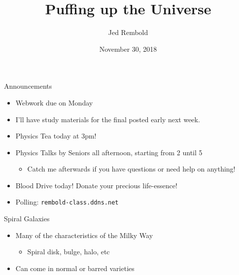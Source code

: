 \documentclass[pdf, aspectratio=169]{beamer}
\title{Puffing up the Universe}
\author{Jed Rembold}
\date{November 30, 2018}
\begin{document}
\renewcommand{\theenumi}{\Alph{enumi}}

\begin{frame}{Announcements}
	\begin{itemize}
		\item Webwork due on Monday
		\item I'll have study materials for the final posted early next week.
		\item Physics Tea today at 3pm!
		\item Physics Talks by Seniors all afternoon, starting from 2 until 5
			\begin{itemize}
				\item Catch me afterwards if you have questions or need help on anything!
			\end{itemize}
		\item Blood Drive today! Donate your precious life-essence!
		\item Polling: \nolinkurl{rembold-class.ddns.net}
	\end{itemize}
\end{frame}

\begin{frame}{Spiral Galaxies}
  \begin{itemize}
	\item Many of the characteristics of the Milky Way
	  \begin{itemize}
		\item Spiral disk, bulge, halo, etc
	  \end{itemize}
	\item Can come in normal or barred varieties
  \end{itemize}
  \begin{center}
  \end{center}
\end{frame}
\end{document}
